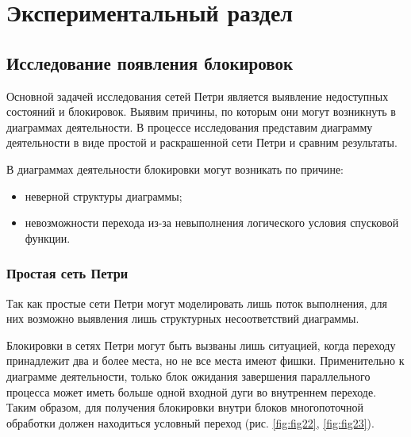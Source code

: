\chapter{Экспериментальный раздел}

\section{Исследование появления блокировок}

Основной задачей исследования сетей Петри является выявление недоступных состояний и блокировок. Выявим причины, по которым они могут возникнуть в диаграммах деятельности. В процессе исследования представим диаграмму деятельности в виде простой и раскрашенной сети Петри и сравним результаты.

В диаграммах деятельности блокировки могут возникать по причине:
\begin{itemize}
\item неверной структуры диаграммы;
\item невозможности перехода из-за невыполнения логического условия спусковой функции.
\end{itemize}

\subsection{Простая сеть Петри}

Так как простые сети Петри могут моделировать лишь поток выполнения, для них возможно выявления лишь структурных несоответствий диаграммы.

Блокировки в сетях Петри могут быть вызваны лишь ситуацией, когда переходу принадлежит два и более места, но не все места имеют фишки. Применительно к диаграмме деятельности, только блок ожидания завершения параллельного процесса может иметь больше одной входной дуги во внутреннем переходе. Таким образом, для получения блокировки внутри блоков многопоточной обработки должен находиться условный переход (рис. \ref{fig:fig22}, \ref{fig:fig23}).

